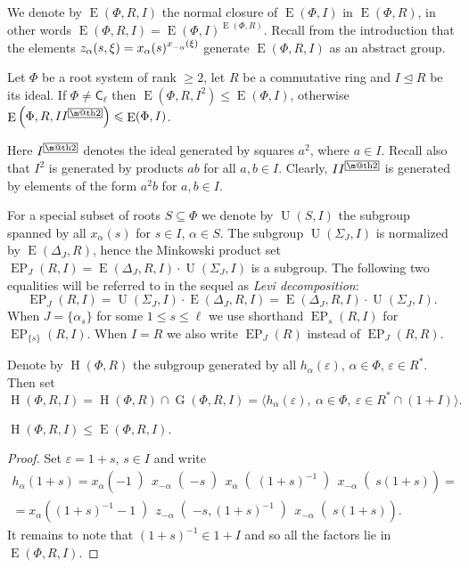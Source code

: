 \documentclass[12pt]{amsart}
\makeatletter
\numberwithin{equation}{section}
\theoremstyle{definition}
\DeclareMathOperator{\G}{G}
\DeclareMathOperator{\E}{E}
\DeclareMathOperator{\EP}{EP}
\DeclareMathOperator{\Hh}{H}
\DeclareMathOperator{\U}{U}
\newcommand{\rC}{\mathsf{C}}
\newcommand{\indexbox}[1]{\text{\fboxsep=.1em\fbox{\m@th$\displaystyle#1$}}}
\def\ssub#1{\mathchoice
   {_{\lower2pt\hbox{$\scriptstyle #1$}}}
   {_{\lower2pt\hbox{$\scriptstyle #1$}}}
   {_{\lower1.5pt\hbox{$\scriptscriptstyle #1$}}}
   {_{\!\lower1.5pt\hbox{$\scriptscriptstyle #1$}}}}
\makeatother
\begin{document}
We denote by $\E(\Phi, R, I)$ the normal closure of $\E(\Phi, I)$ in $\E(\Phi, R)$, in other words $\E(\Phi, R, I) = \E(\Phi, I)^{\E(\Phi, R)}$.
Recall from the introduction that the elements $z_\alpha(s, \xi) = x_\alpha(s)^{x\ssub{-\alpha}(\xi)}$ generate $\E(\Phi, R, I)$ as an abstract group.

\begin{lemma}[{\cite[Corollary~3.3]{S}}]\label{lemma:Stepanov-ideal}
Let $\Phi$ be a root system of rank $\geqslant2$, let $R$ be a commutative ring and $I\trianglelefteq R$ be its ideal.
If $\Phi\neq\rC_\ell$ then $\E\left(\Phi,R,I^2\right)\leqslant\E(\Phi,I)$, otherwise $\E\left(\Phi,R,II^{\indexbox{2}}\right)\leqslant\E(\Phi,I)$.
\end{lemma}
Here $I^{\indexbox{2}}$ denotes the ideal generated by squares $a^2$, where $a\in I$.
Recall also that $I^2$ is generated by products $ab$ for all $a,b\in I$.
Clearly, $II^{\indexbox{2}}$ is generated by elements of the form $a^2b$ for $a,b\in I$.

For a special subset of roots $S\subseteq \Phi$ we denote by $\U(S, I)$ the subgroup spanned by all $x_{\alpha}(s)$ for $s\in I$, $\alpha\in S$.
The subgroup $\U(\Sigma_J, I)$ is normalized by $\E(\Delta_J, R)$, hence the Minkowski product set $\EP_J(R, I) = \E(\Delta_J, R, I) \cdot \U(\Sigma_J, I)$ is a subgroup. 
The following two equalities will be referred to in the sequel as {\it Levi decomposition}: 
\begin{equation} \label{rel:Levi-decomp} \EP_J(R, I) = \U(\Sigma_J, I) \cdot \E(\Delta_J, R, I) = \E(\Delta_J, R, I) \cdot \U(\Sigma_J, I). \end{equation}
When $J = \{ \alpha_s \}$ for some $1 \leq s\leq \ell$ we use shorthand $\EP_s(R, I)$ for $\EP_{\{s\}}(R, I)$.
When $I=R$ we also write $\EP_J(R)$ instead of $\EP_J(R, R)$.

Denote by $\Hh(\Phi,R)$ the subgroup generated by all $h_\alpha(\varepsilon)$, $\alpha\in\Phi$, $\varepsilon\in R^*$. Then set
\[ \Hh(\Phi,R,I) = \Hh(\Phi,R)\cap\G(\Phi,R,I)=\langle h_\alpha(\varepsilon),\ \alpha\in\Phi,\ \varepsilon\in R^*\cap(1+I)\rangle. \]
\begin{lemma}\label{lemma:rel-tor-elementary} $\Hh(\Phi,R,I)\leqslant\E(\Phi,R,I)$. \end{lemma}
\begin{proof}
Set $\varepsilon=1+s$, $s\in I$ and write
\begin{multline*}
h_\alpha(1+s) = x_\alpha\left(-1\middle)\, x_{-\alpha}\middle(-s\middle)\, x_\alpha\middle((1+s)^{-1}\middle)\, x_{-\alpha}\middle(s(1+s)\right) = \\
= x_\alpha\left((1+s)^{-1}-1\middle)\, z_{-\alpha}\middle(-s,(1+s)^{-1}\middle)\, x_{-\alpha}\middle(s(1+s)\right).
\end{multline*}
It remains to note that $(1+s)^{-1}\in 1+I$ and so all the factors lie in $\E(\Phi,R,I)$.
\end{proof}
\end{document}
